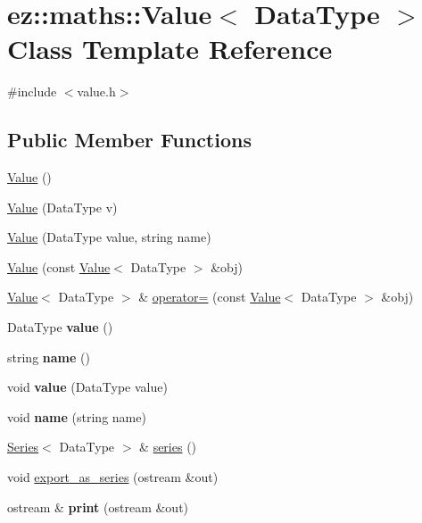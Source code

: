 \hypertarget{classez_1_1maths_1_1Value}{}\section{ez\+:\+:maths\+:\+:Value$<$ Data\+Type $>$ Class Template Reference}
\label{classez_1_1maths_1_1Value}


{\ttfamily \#include $<$value.\+h$>$}

\subsection*{Public Member Functions}
\begin{DoxyCompactItemize}
\item 
\hyperlink{classez_1_1maths_1_1Value_ac21c584a161b8e6d8bc9871b7b1bfa97}{Value} ()
\item 
\hyperlink{classez_1_1maths_1_1Value_a24dc3abce0a0b713f807cba552acd110}{Value} (Data\+Type v)
\item 
\hyperlink{classez_1_1maths_1_1Value_a7a52ba11e0c0fdec6d303eab54c13738}{Value} (Data\+Type value, string name)
\item 
\hyperlink{classez_1_1maths_1_1Value_a78b4d0d160978c3c6292e180e79b9662}{Value} (const \hyperlink{classez_1_1maths_1_1Value}{Value}$<$ Data\+Type $>$ \&obj)
\item 
\hyperlink{classez_1_1maths_1_1Value}{Value}$<$ Data\+Type $>$ \& \hyperlink{classez_1_1maths_1_1Value_a79c473c4b510f71607c861ee806e4050}{operator=} (const \hyperlink{classez_1_1maths_1_1Value}{Value}$<$ Data\+Type $>$ \&obj)
\item 
\mbox{\label{classez_1_1maths_1_1Value_addf4c0cc5bea3573bf6eeaa46f2938d9}} 
Data\+Type {\bfseries value} ()
\item 
\mbox{\label{classez_1_1maths_1_1Value_a7e493b21dca7b9cbf36830265fa8315e}} 
string {\bfseries name} ()
\item 
\mbox{\label{classez_1_1maths_1_1Value_ac074e1525444c95ad332bc96c2907b08}} 
void {\bfseries value} (Data\+Type value)
\item 
\mbox{\label{classez_1_1maths_1_1Value_acfe7337b904455908abe9c6a886b5b56}} 
void {\bfseries name} (string name)
\item 
\hyperlink{classez_1_1maths_1_1Series}{Series}$<$ Data\+Type $>$ \& \hyperlink{classez_1_1maths_1_1Value_ad94111af5be1b5cb3fbde35d38f0d8a1}{series} ()
\item 
void \hyperlink{classez_1_1maths_1_1Value_a8e05fc26bd5bce27feecaa5131efa946}{export\+\_\+as\+\_\+series} (ostream \&out)
\item 
\mbox{\label{classez_1_1maths_1_1Value_ace410049464f8a4f643c8f130b0e6f8f}} 
ostream \& {\bfseries print} (ostream \&out)
\end{DoxyCompactItemize}
